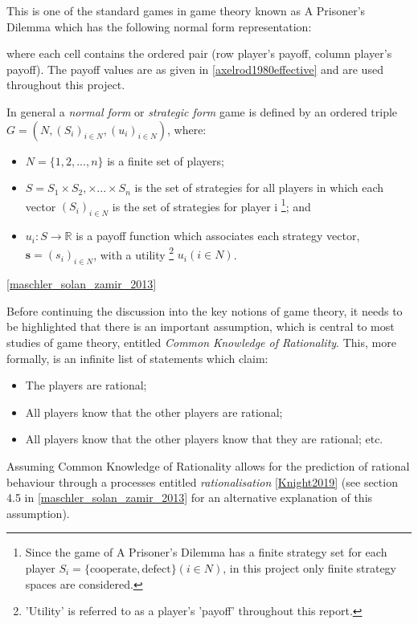 This is one of the standard games in game theory known as A Prisoner's Dilemma
which has the following normal form representation:

\label{PDMatrix}

where each cell contains the ordered pair (row player's payoff, column player's
payoff). The payoff values are as given in \ref{axelrod1980effective} and are
used throughout this project.

In general a \textit{normal form} or \textit{strategic form} game is defined by
an ordered triple $G = (N, (S_i)_{i \in N}, (u_i)_{i \in N})$, where:
\begin{itemize}
    \item $N = \{1, 2,..., n\}$ is a finite set of players;
    \item $S = S_1 \times S_2, \times ... \times S_n$ is the set of strategies
    for all players in which each vector $(S_i)_{i \in N}$ is the set of
    strategies for player i \footnote{Since the game of A Prisoner's Dilemma has
    a finite strategy set for each player $S_i = \{ \text{cooperate},
    \text{defect}\} (i \in N)$, in this project only finite strategy spaces are
    considered.}; and
    \item $u_i : S \to \mathbb{R}$ is a payoff function which associates each
    strategy vector, $\textbf{s} = (s_i)_{i \in N}$, with a utility
    \footnote{'Utility' is referred to as a player's 'payoff' throughout this
    report.} $u_i(i \in N)$.
\end{itemize}
\ref{maschler_solan_zamir_2013}

Before continuing the discussion into the key notions of game theory, it needs
to be highlighted that there is an important assumption, which is central to
most studies of game theory, entitled \textit{Common Knowledge of Rationality}.
This, more formally, is an infinite list of statements which claim:
    \begin{itemize}
        \item The players are rational;
        \item All players know that the other players are rational;
        \item All players know that the other players know that they are rational; etc.    
    \end{itemize}
Assuming Common Knowledge of Rationality allows for the prediction of rational
behaviour through a processes entitled \textit{rationalisation} \ref{Knight2019}
(see section 4.5 in \ref{maschler_solan_zamir_2013} for an alternative
explanation of this assumption). 


